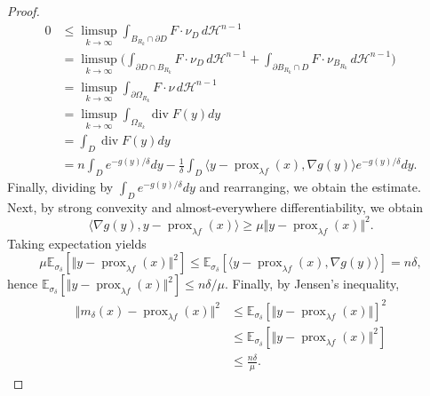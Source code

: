\documentclass[11pt]{amsart}
\newcommand{\1}{\mathds{1}}
\theoremstyle{definition}
\theoremstyle{remark}
\theoremstyle{definition}
\begin{document}
\begin{proof}
\begin{equation*}
\begin{aligned}
    0&\leq \limsup_{k\to \infty} \int_{ B_{R_k}\cap \partial D }  F\cdot \nu_D\, d\mathcal{H}^{n-1}\\
    &=\limsup_{k\to \infty}\Big(\int_{\partial D\cap  {B}_{R_k}  }  F\cdot \nu_D\, d\mathcal{H}^{n-1}+\int_{\partial {B}_{R_k}\cap D}  F\cdot \nu_{{B}_{R_k}}\, d\mathcal{H}^{n-1}\Big)\\
    &=\limsup_{k\to \infty}\int_{\partial \Omega_{R_k}} F\cdot \nu\, d\mathcal{H}^{n-1}\\
    &=\limsup_{k\to \infty}\int_{\Omega_{R_k}} \operatorname{div}F(y)dy\\
    &=\int_D \operatorname{div}F(y)dy\\
    &=n\int_D e^{-g(y)/\delta}dy-\frac{1}{\delta}\int_D \langle y-\operatorname{prox}_{\lambda f}(x),\nabla g(y)\rangle e^{-g(y)/\delta}dy.
\end{aligned}
\end{equation*}
Finally, dividing by $\int_{D}e^{-g(y)/\delta}dy$ and rearranging, we obtain the estimate. 
Next, by strong convexity and almost-everywhere differentiability, we obtain
$$
\langle \nabla g(y),y-\operatorname{prox}_{\lambda f}(x)\rangle \geq \mu \Vert y-\operatorname{prox}_{\lambda f}(x)\Vert^2.
$$
Taking expectation yields
$$
\mu \mathbb{E}_{\sigma_{\delta}}\left[\Vert y-\operatorname{prox}_{\lambda f}(x)\Vert^2\right]\leq\mathbb{E}_{\sigma_{\delta}}\left[\langle y-\operatorname{prox}_{\lambda f}(x),\nabla g(y)\rangle \right]=n\delta,
$$
hence $\mathbb{E}_{\sigma_{\delta}}\left[\Vert y-\operatorname{prox}_{\lambda f}(x)\Vert^2\right]\leq n\delta /\mu$. Finally, by Jensen's inequality, 
\begin{equation*}
    \begin{aligned}
  \Vert m_{\delta}(x)-\operatorname{prox}_{\lambda f}(x)\Vert^2&\leq \mathbb{E}_{\sigma_{\delta}}\left[\Vert y-\operatorname{prox}_{\lambda f}(x)\Vert\right]^2\\
  &\leq  \mathbb{E}_{\sigma_{\delta}}\left[\Vert y-\operatorname{prox}_{\lambda f}(x)\Vert^2\right]\\
  &\leq \frac{n\delta}{\mu}.    
    \end{aligned}
\end{equation*}
\end{proof}
\end{document}
